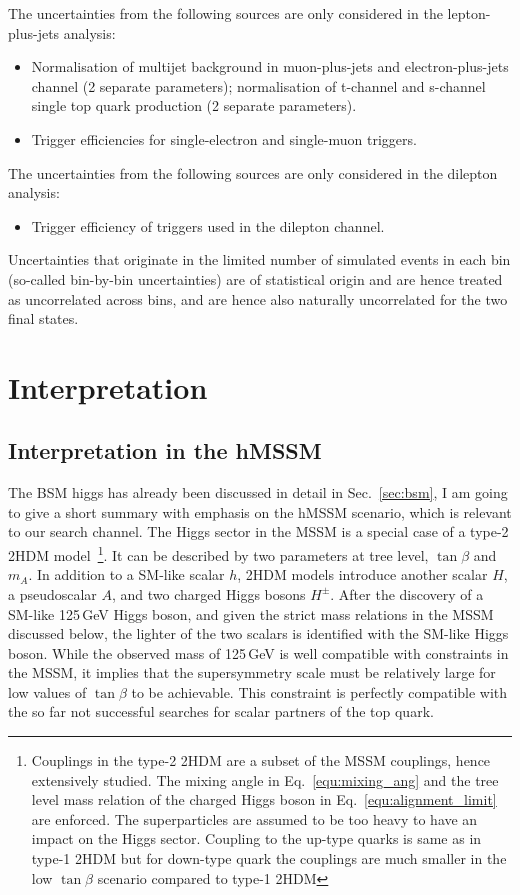The uncertainties from the following sources are only considered in the lepton-plus-jets analysis:

\begin{itemize}
        \item Normalisation of multijet background in muon-plus-jets and electron-plus-jets channel (2 separate parameters); normalisation of t-channel and s-channel single top quark production (2 separate parameters).
        \item Trigger efficiencies for single-electron and single-muon triggers.
\end{itemize}

The uncertainties from the following sources are only considered in the dilepton analysis:

\begin{itemize}
        \item Trigger efficiency of triggers used in the dilepton channel.
\end{itemize}

Uncertainties that originate in the limited number of simulated events in each bin (so-called bin-by-bin uncertainties) are of statistical origin and are hence treated as uncorrelated across bins, and are hence also naturally uncorrelated for the two final states.

\section{Interpretation}
\label{sec:interpretation}
\subsection{Interpretation in the hMSSM}
\label{sec:hmssm}
The BSM higgs has already been discussed in detail in Sec.~\ref{sec:bsm}, I am going to give a short summary with emphasis on the hMSSM scenario, which is relevant to our search channel. The Higgs sector in the MSSM is a special case of a type-2 2HDM model~\footnote{Couplings in the type-2 2HDM are a subset of the MSSM couplings, hence extensively studied. The mixing angle in Eq.~\ref{equ:mixing_ang} and the tree level mass relation of the charged Higgs boson in Eq.~\ref{equ:alignment_limit} are enforced. The superparticles are assumed to be too heavy to have an impact on the Higgs sector. Coupling to the up-type quarks is same as in type-1 2HDM but for down-type quark the couplings are much smaller in the low $\tan\beta$ scenario compared to type-1 2HDM}.
It can be described by two parameters at tree level, $\tan\beta$ and $m_A$.
In addition to a SM-like scalar $h$, 2HDM models introduce another scalar $H$, a pseudoscalar $A$, and two charged Higgs bosons $H^\pm$. After the discovery of a SM-like 125\,GeV Higgs boson, and given the strict mass relations in the MSSM discussed below, the lighter of the two scalars is identified with the SM-like Higgs boson. While the observed mass of 125\,GeV is well compatible with constraints in the MSSM, it implies that the supersymmetry scale must be relatively large for low values of $\tan\beta$ to be achievable. This constraint is perfectly compatible with the so far not successful searches for scalar partners of the top quark.

